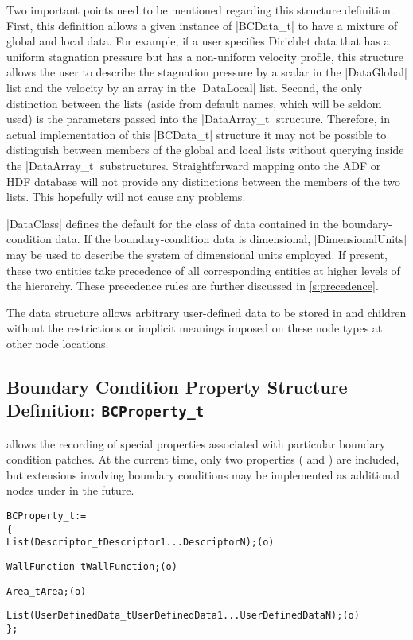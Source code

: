 Two important points need to be mentioned regarding this structure
definition.  First, this definition allows a given instance of
|BCData_t| to have a mixture of global and local data.  For example, if
a user specifies Dirichlet data that has a uniform stagnation pressure
but has a non-uniform velocity profile, this structure allows the user
to describe the stagnation pressure by a scalar in the |DataGlobal| list
and the velocity by an array in the |DataLocal| list.  Second, the only
distinction between the lists (aside from default names, which will be
seldom used) is the parameters passed into the |DataArray_t| structure.
Therefore, in actual implementation of this |BCData_t| structure it
may not be possible to distinguish between members of the global and
local lists without querying inside the |DataArray_t| substructures.
Straightforward mapping onto the ADF or HDF database will not provide any
distinctions between the members of the two lists.  This hopefully will
not cause any problems.

|DataClass| defines the default for the class of data contained in the
boundary-condition data.
If the boundary-condition data is dimensional, |DimensionalUnits| may be
used to describe the system of dimensional units employed.
If present, these two entities take precedence of all corresponding
entities at higher levels of the hierarchy.
These precedence rules are further discussed in \autoref{s:precedence}.

The  data structure allows arbitrary
user-defined data to be stored in  and
 children without the restrictions or implicit
meanings imposed on these node types at other node locations.

\subsection{Boundary Condition Property Structure Definition: \texttt{BCProperty\_t}}
\label{s:BCProperty}

 allows the recording of special properties associated
with particular boundary condition patches.
At the current time, only two properties (
and ) are included, but extensions involving
boundary conditions may be implemented as additional nodes under
 in the future.

\begin{alltt}
  BCProperty\_t :=
    \{
    List( Descriptor\_t  Descriptor1 ... DescriptorN ) ;                     (o)

    WallFunction\_t WallFunction ;                                           (o)

    Area\_t Area ;                                                           (o)

    List( UserDefinedData\_t UserDefinedData1 ... UserDefinedDataN ) ;       (o)
    \} ;
\end{alltt}


